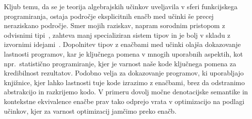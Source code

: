 \documentclass{article}
\begin{document}
Kljub temu, da se je teorija algebrajskih učinkov uveljavila v sferi funkcijskega programiranja, ostaja področje eksplicitnih enačb med učinki še precej neraziskano področje. Smer mojih raziskav, napram sorodnim pristopom z odvisnimi tipi~\cite{DBLP:journals/pacmpl/Ahman18}, zahteva manj specializiran sistem tipov in je bolj v skladu z izvornimi idejami~\cite{DBLP:conf/esop/PlotkinP09}. Dopolnitev tipov z enačbami med učinki olajša dokazovanje lastnosti programov, kar je ključnega pomena v mnogih uporabnih aspektih, kot npr.\ statistično programiranje, kjer je varnost naše kode ključnega pomena za kredibilnost rezultatov. Podobno velja za dokazovanje programov, ki uporabljajo knjižnice, kjer lahko lastnosti tuje kode izrazimo z enačbami, brez da odstranimo abstrakcijo in razkrijemo kodo. V primeru dovolj močne denotacijske semantike in kontekstne ekvivalence enačbe prav tako odprejo vrata v optimizacijo na podlagi učinkov, kjer za varnost optimizacij jamčimo preko enačb.

\renewcommand\refname{Literatura}


\end{document}
